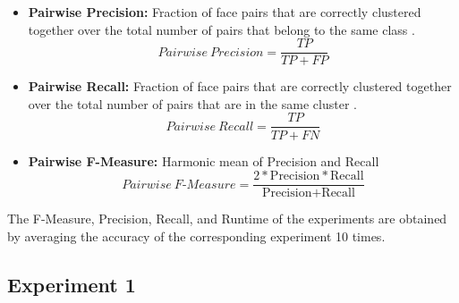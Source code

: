 \documentclass[12pt,english]{article}
\begin{document}
\begin{itemize}
\item \textbf{Pairwise Precision:} Fraction of face pairs that are correctly clustered together over the total number of pairs that belong to the same class \cite{shi}.
$$ Pairwise \ Precision = \frac{TP}{TP + FP}$$

\item \textbf{Pairwise Recall:} Fraction of face pairs that are correctly clustered together over the total number of pairs that are in the same cluster \cite{shi}.
$$ Pairwise \ Recall = \frac{TP}{TP + FN}$$

\item \textbf{Pairwise F-Measure:} Harmonic mean of Precision and Recall \cite{shi} $$Pairwise \ F\textrm{-}Measure = \frac{2 * \textrm{Precision}*\textrm{Recall}}{\textrm{Precision} + \textrm{Recall}}$$
\end{itemize}

The F-Measure, Precision, Recall, and Runtime of the experiments are obtained by averaging the accuracy of the corresponding experiment 10 times.

\subsection{Experiment 1}
\end{document}
